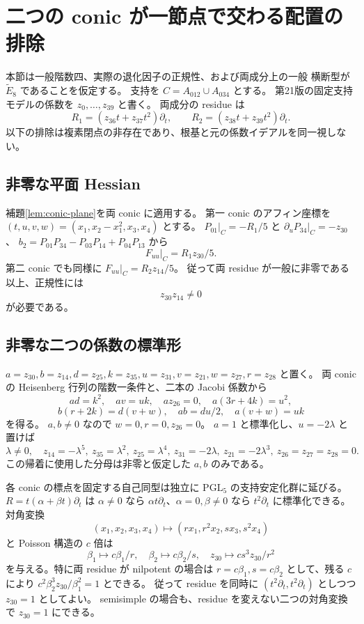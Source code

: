 \section{二つの conic が一節点で交わる配置の排除}

本節は一般階数四、実際の退化因子の正規性、および両成分上の一般
横断型が $\widetilde E_8$ であることを仮定する。
支持を $C=A_{012}\cup A_{034}$ とする。
第21版の固定支持モデルの係数を $z_0,\ldots,z_{39}$ と書く。
両成分の residue は
\[
R_1=(z_{36}t+z_{37}t^2)\partial_t,\qquad
R_2=(z_{38}t+z_{39}t^2)\partial_t.
\]
以下の排除は複素閉点の非存在であり、根基と元の係数イデアルを同一視しない。

\subsection{非零な平面 Hessian}
補題\ref{lem:conic-plane}を両 conic に適用する。
第一 conic のアフィン座標を
$(t,u,v,w)=(x_1,x_2-x_1^2,x_3,x_4)$ とする。
$P_{01}|_C=-R_1/5$ と $\partial_uP_{34}|_C=-z_{30}$、
$b_2=P_{01}P_{34}-P_{03}P_{14}+P_{04}P_{13}$ から
\[
F_{uu}|_C=R_1z_{30}/5.
\]
第二 conic でも同様に $F_{uu}|_C=R_2z_{14}/5$。
従って両 residue が一般に非零である以上、正規性には
\[
z_{30}z_{14}\ne0
\]
が必要である。

\subsection{非零な二つの係数の標準形}

$a=z_{30},b=z_{14},d=z_{25},k=z_{35},u=z_{31},v=z_{21},w=z_{27},r=z_{28}$ と置く。
両 conic の Heisenberg 行列の階数一条件と、二本の Jacobi 係数から
\[
ad=k^2,\quad av=uk,\quad a z_{26}=0,\quad a(3r+4k)=u^2,
\]
\[
b(r+2k)=d(v+w),\quad ab=du/2,\quad a(v+w)=uk
\]
を得る。
$a,b\ne0$ なので $w=0,r=0,z_{26}=0$。
$a=1$ と標準化し、$u=-2\lambda$ と置けば
\[
\lambda\ne0,\quad
z_{14}=-\lambda^5,\ z_{35}=\lambda^2,\ z_{25}=\lambda^4,\
z_{31}=-2\lambda,\ z_{21}=-2\lambda^3,\ z_{26}=z_{27}=z_{28}=0.
\]
この帰着に使用した分母は非零と仮定した $a,b$ のみである。

各 conic の標点を固定する自己同型は独立に $\mathrm{PGL}_5$ の支持安定化群に延びる。
$R=t(\alpha+\beta t)\partial_t$ は $\alpha\ne0$ なら
$\alpha t\partial_t$、$\alpha=0,\beta\ne0$ なら $t^2\partial_t$ に標準化できる。
対角変換
\[
(x_1,x_2,x_3,x_4)\mapsto(rx_1,r^2x_2,sx_3,s^2x_4)
\]
と Poisson 構造の $c$ 倍は
\[
\beta_1\mapsto c\beta_1/r,\quad
\beta_2\mapsto c\beta_2/s,\quad
z_{30}\mapsto cs^3z_{30}/r^2
\]
を与える。特に両 residue が nilpotent の場合は
$r=c\beta_1,s=c\beta_2$ として、残る $c$ により
$c^2\beta_2^3z_{30}/\beta_1^2=1$ とできる。
従って residue を同時に $(t^2\partial_t,t^2\partial_t)$ としつつ $z_{30}=1$ としてよい。
semisimple の場合も、residue を変えない二つの対角変換で $z_{30}=1$ にできる。

